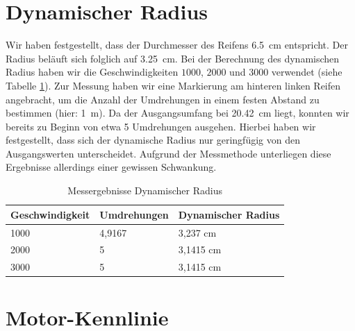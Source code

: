 \documentclass[10pt]{article}
\begin{document}
\section{Dynamischer Radius}
    Wir haben festgestellt, dass der Durchmesser des Reifens \SI{6,5}{\cm} entspricht.
    Der Radius beläuft sich folglich auf \SI{3,25}{\cm}.
    Bei der Berechnung des dynamischen Radius haben wir die Geschwindigkeiten $1000$, $2000$ und $3000$ verwendet (siehe Tabelle \ref{tab:dynamicradius}).
    Zur Messung haben wir eine Markierung am hinteren linken Reifen angebracht, um die Anzahl der Umdrehungen in einem festen Abstand zu bestimmen (hier: \SI{1}{m}).
    Da der Ausgangsumfang bei \SI{20,42}{\cm} liegt, konnten wir bereits zu Beginn von etwa 5 Umdrehungen ausgehen.
    Hierbei haben wir festgestellt, dass sich der dynamische Radius nur geringfügig von den Ausgangswerten unterscheidet.
    Aufgrund der Messmethode unterliegen diese Ergebnisse allerdings einer gewissen Schwankung.
    \begin{table}[bthp]
        \caption{Messergebnisse Dynamischer Radius}
        \label{tab:dynamicradius}
        \centering
        \begin{tabular}{|l|l|l|}
        Geschwindigkeit & Umdrehungen & Dynamischer Radius \\ \hline
        1000            & 4,9167      & 3,237 cm           \\
        2000            & 5           & 3,1415 cm          \\
        3000            & 5           & 3,1415 cm
        \end{tabular}
    \end{table}

\section{Motor-Kennlinie}
\end{document}
